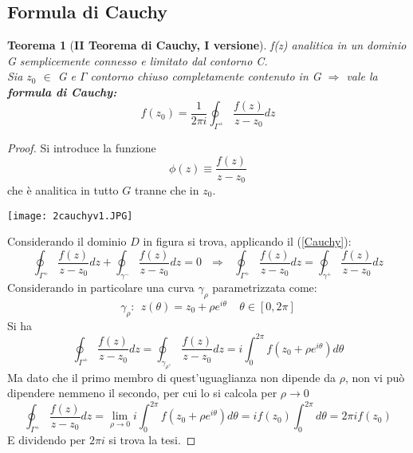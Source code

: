 \documentclass[twoside]{article}
\newtheorem{theorem}{Teorema}[section]
\begin{document}
\subsection{Formula di Cauchy}
\begin{theorem}[\textbf{II Teorema di Cauchy, I versione}] \label{II Cauchy 1v}
f(z) analitica in un dominio G semplicemente connesso e limitato dal contorno C.\\
Sia $z_0$ $\in$ G e $\Gamma$ contorno chiuso completamente contenuto in G $\Longrightarrow$ vale la \textbf{formula di Cauchy:}
\begin{equation}\label{4.1.1}
    f(z_0)=\frac{1}{2\pi i}\oint_{\Gamma^+}\frac{f(z)}{z-z_0}dz
\end{equation}

\end{theorem}

\begin{proof} 
Si introduce la funzione 
\begin{equation}
    \phi(z)\equiv \frac{f(z)}{z-z_0}
\end{equation}
che è analitica in tutto $G$ tranne che in $z_0$.
\begin{center}
    \texttt{[image: 2cauchyv1.JPG]}
\end{center}
Considerando il dominio $D$ in figura si trova, applicando il (\ref{Cauchy}):
\begin{equation}
    \oint_{\Gamma^+}\frac{f(z)}{z-z_0}dz+\oint_{\gamma^-}\frac{f(z)}{z-z_0}dz=0 \ \ \ \Rightarrow \ \ \ \oint_{\Gamma^+}\frac{f(z)}{z-z_0}dz=\oint_{\gamma^+}\frac{f(z)}{z-z_0}dz
\end{equation}
Considerando in particolare una curva $\gamma_{\rho}$ parametrizzata come:
\begin{equation}
    \gamma_{\rho}: \ \ z(\theta)=z_0+\rho e^{i\theta} \ \ \ \ \ \theta \in [0,2\pi]
\end{equation}
Si ha
\begin{equation}
    \oint_{\Gamma^+}\frac{f(z)}{z-z_0}dz=\oint_{\gamma_{\rho^+}}\frac{f(z)}{z-z_0}dz=i\int_{0}^{2\pi}f(z_0+\rho e^{i\theta})d\theta
\end{equation}
Ma dato che il primo membro di quest'uguaglianza non dipende da $\rho$, non vi può dipendere nemmeno il secondo, per cui lo si calcola per $\rho \to 0$
\begin{equation}
    \oint_{\Gamma^+}\frac{f(z)}{z-z_0}dz=\lim_{\rho \to 0}i\int_{0}^{2\pi}f(z_0+\rho e^{i\theta})d\theta=if(z_0)\int_0^{2\pi}d\theta=2\pi i f(z_0)
\end{equation}
E dividendo per $2\pi i$ si trova la tesi.


\end{proof}
\end{document}
